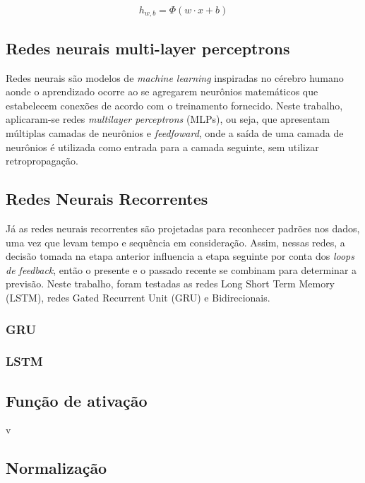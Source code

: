 \begin{equation}
  h_{w,b} = \Phi(w \cdot x + b)
\end{equation}


\subsection{Redes neurais multi-layer perceptrons}
Redes neurais são modelos de \textit{machine learning} 
inspiradas no cérebro humano aonde o aprendizado ocorre 
ao se agregarem neurônios matemáticos que 
estabelecem conexões de acordo com o treinamento fornecido. 
Neste trabalho, aplicaram-se redes 
\textit{multilayer perceptrons} (MLPs), ou seja, que 
apresentam múltiplas camadas de neurônios 
e \textit{feedfoward}, onde a saída de 
uma camada de neurônios é utilizada como entrada para a camada seguinte, sem utilizar retropropagação.
          
        
\subsection{Redes Neurais Recorrentes}
  
Já as redes neurais recorrentes são projetadas para reconhecer padrões nos dados, uma vez que levam tempo e sequência em consideração. Assim, nessas redes, a decisão tomada na etapa anterior influencia a etapa seguinte por conta dos \textit{loops de feedback}, então o presente e o passado recente se combinam para determinar a previsão. Neste trabalho, foram testadas as redes Long Short Term Memory (LSTM), redes Gated Recurrent Unit (GRU) e Bidirecionais.
  
\subsubsection{GRU}

\subsubsection{LSTM}

\subsection{Função de ativação}

v

\subsection{Normalização}